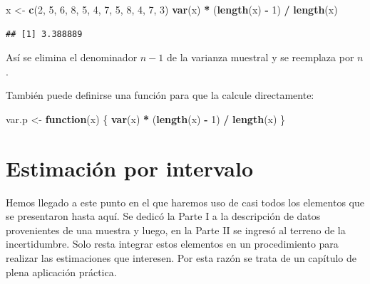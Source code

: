 \documentclass[]{book}
\newenvironment{Shaded}{\begin{snugshade}}{\end{snugshade}}
\newcommand{\ControlFlowTok}[1]{\textcolor[rgb]{0.13,0.29,0.53}{\textbf{#1}}}
\newcommand{\DecValTok}[1]{\textcolor[rgb]{0.00,0.00,0.81}{#1}}
\newcommand{\KeywordTok}[1]{\textcolor[rgb]{0.13,0.29,0.53}{\textbf{#1}}}
\newcommand{\NormalTok}[1]{#1}
\newcommand{\OperatorTok}[1]{\textcolor[rgb]{0.81,0.36,0.00}{\textbf{#1}}}
\newcommand{\StringTok}[1]{\textcolor[rgb]{0.31,0.60,0.02}{#1}}
\begin{document}
\begin{Shaded}
\begin{Highlighting}[]
\NormalTok{x <-}\StringTok{ }\KeywordTok{c}\NormalTok{(}\DecValTok{2}\NormalTok{, }\DecValTok{5}\NormalTok{, }\DecValTok{6}\NormalTok{, }\DecValTok{8}\NormalTok{, }\DecValTok{5}\NormalTok{, }\DecValTok{4}\NormalTok{, }\DecValTok{7}\NormalTok{, }\DecValTok{5}\NormalTok{, }\DecValTok{8}\NormalTok{, }\DecValTok{4}\NormalTok{, }\DecValTok{7}\NormalTok{, }\DecValTok{3}\NormalTok{)}
\KeywordTok{var}\NormalTok{(x) }\OperatorTok{*}\StringTok{ }\NormalTok{(}\KeywordTok{length}\NormalTok{(x) }\OperatorTok{-}\StringTok{ }\DecValTok{1}\NormalTok{) }\OperatorTok{/}\StringTok{ }\KeywordTok{length}\NormalTok{(x)}
\end{Highlighting}
\end{Shaded}

\begin{verbatim}
## [1] 3.388889
\end{verbatim}

Así se elimina el denominador \(n-1\) de la varianza muestral y se reemplaza por \(n\).

También puede definirse una función para que la calcule directamente:

\begin{Shaded}
\begin{Highlighting}[]
\NormalTok{var.p <-}\StringTok{ }\ControlFlowTok{function}\NormalTok{(x) \{}
  \KeywordTok{var}\NormalTok{(x) }\OperatorTok{*}\StringTok{ }\NormalTok{(}\KeywordTok{length}\NormalTok{(x) }\OperatorTok{-}\StringTok{ }\DecValTok{1}\NormalTok{) }\OperatorTok{/}\StringTok{ }\KeywordTok{length}\NormalTok{(x)}
\NormalTok{\}}
\end{Highlighting}
\end{Shaded}

\hypertarget{estimaciuxf3n-por-intervalo}{%
\chapter{Estimación por intervalo}\label{estimaciuxf3n-por-intervalo}}

Hemos llegado a este punto en el que haremos uso de casi todos los
elementos que se presentaron hasta aquí. Se dedicó la Parte I a la
descripción de datos provenientes de una muestra y luego, en la Parte II
se ingresó al terreno de la incertidumbre. Solo resta integrar estos
elementos en un procedimiento para realizar las estimaciones que
interesen. Por esta razón se trata de un capítulo de plena aplicación
práctica.
\end{document}
